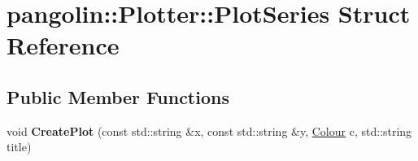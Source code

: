 \hypertarget{structpangolin_1_1_plotter_1_1_plot_series}{}\section{pangolin\+:\+:Plotter\+:\+:Plot\+Series Struct Reference}
\label{structpangolin_1_1_plotter_1_1_plot_series}
\subsection*{Public Member Functions}
\begin{DoxyCompactItemize}
\item 
void {\bfseries Create\+Plot} (const std\+::string \&x, const std\+::string \&y, \hyperlink{structpangolin_1_1_colour}{Colour} c, std\+::string title)\hypertarget{structpangolin_1_1_plotter_1_1_plot_series_a772fbedf1f76b1bb26987a0e51bfa914}{}\label{structpangolin_1_1_plotter_1_1_plot_series_a772fbedf1f76b1bb26987a0e51bfa914}

\end{DoxyCompactItemize}
